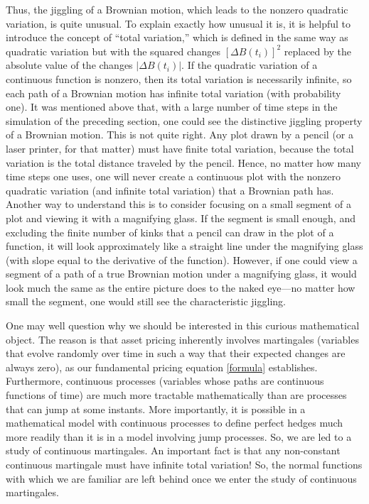 Thus, the jiggling of a Brownian motion, which leads to the nonzero quadratic variation, is quite unusual.  To explain exactly how unusual it is, it is helpful to introduce the concept of ``total variation,''  which is defined in the same way as quadratic variation but with the squared changes $[\varDelta B(t_i)]^2$ replaced by the absolute value of the changes $|\varDelta B(t_i)|.$  If the quadratic variation of a continuous function is nonzero, then its total variation is necessarily infinite, so each path of a Brownian motion has infinite total variation (with probability one).  It was mentioned above that, with a large number of time steps in the simulation of the preceding section, one could see the distinctive jiggling property of a Brownian motion.  This is not quite right.  Any plot drawn by a pencil (or a laser printer, for that matter) must have finite total variation, because the total variation is the total distance traveled by the pencil.  Hence, no matter how many time steps one uses, one will never create a continuous plot with the nonzero quadratic variation (and infinite total variation) that a Brownian path has.  Another way to understand this is to consider focusing on a small segment of a plot and viewing it with a magnifying glass.  If the segment is small enough, and excluding the finite number of kinks that a pencil can draw in the plot of a function, it will look approximately like a straight line under the magnifying glass (with slope equal to the derivative of the function).  However, if one could view a segment of a path of a true Brownian motion under a magnifying glass, it would look much the same as the entire picture does to the naked eye---no matter how small the segment, one would still see the characteristic jiggling.

One may well question why we should be interested in this curious mathematical object.  The reason is that asset pricing inherently involves martingales (variables that evolve randomly over time in such a way that their expected changes are always zero), as our fundamental pricing equation \eqref{formula} establishes.  Furthermore, continuous processes (variables whose paths are continuous functions of time) are much more tractable mathematically than are processes that can jump at some instants.  More importantly, it is possible in a mathematical model with continuous processes to define perfect hedges much more readily than it is in a model involving jump processes.  So, we are led to a study of continuous martingales.  An important fact is that any non-constant continuous martingale must have infinite total variation!  So, the normal functions with which we are familiar are left behind once we enter the study of continuous martingales.  

